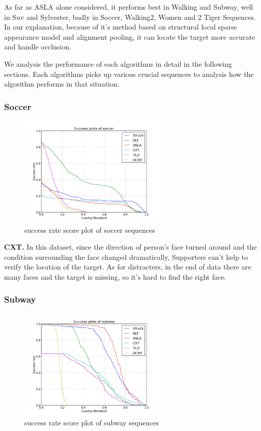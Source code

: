 \documentclass{acm_proc_article-sp}
\begin{document}
As far as ASLA alone considered, it performs best in Walking and Subway, well in Suv and Sylvester, badly in Soccer, Walking2, Women and 2 Tiger Sequences. 
In our explanation, because of it's method based on structural local sparse appearance model and alignment pooling, it can locate the target more accurate and handle occlusion. 

We analysis the performance of each algorithms in detail in the following sections. Each algorithms picks up various crucial sequences to analysis how the algorithm performs in that situation.

\subsubsection{Soccer}



\begin{figure}[hbt]
    \includegraphics[width=200pt]{soccer}
    \caption{success rate score plot of soccer sequences}
    \label{fig:soccer}
\end{figure}

\textbf{CXT.} In this dataset, since the direction of person's face turned around and the condition surrounding the face changed dramatically, Supporters can't help to verify the location of the target. As for distracters, in the end of data there are many faces and the target is missing, so it's hard to find the right face.

\subsubsection{Subway}

\begin{figure}[hbt]
    \includegraphics[width=200pt]{subway}
    \caption{success rate score plot of subway sequences}
    \label{fig:subway}
\end{figure}
\end{document}
